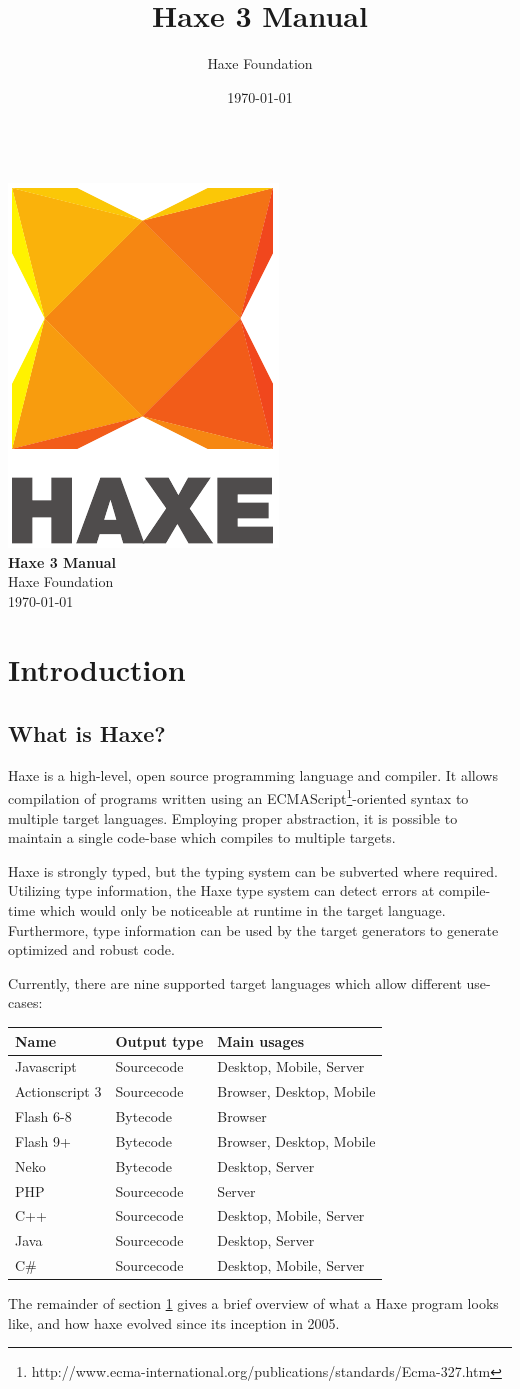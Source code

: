 \documentclass[a4paper,oneside]{book}
\renewcommand{\maketitle}{
   \begin{titlepage}
     \setcounter{page}{-1}
			\begin{center}
				~\\[3cm]
				\includegraphics[scale=1.25]{assets/logo.pdf}~\\[1cm]
				{\huge \bfseries Haxe 3 Manual}\\[7cm]
				Haxe Foundation\\
				\today
			\end{center}
   \end{titlepage}
}
\begin{document}
\title{Haxe 3 Manual}
\author{Haxe Foundation}
\date{\today}
\maketitle


\clearpage
\todototoc
\listoftodos
\clearpage

\clearpage
\tableofcontents
\clearpage

\chapter{Introduction}
\label{introduction}

\section{What is Haxe?}
\label{introduction-what-is-haxe}

Haxe is a high-level, open source programming language and compiler. It allows compilation of programs written using an ECMAScript\footnote{http://www.ecma-international.org/publications/standards/Ecma-327.htm}-oriented syntax to multiple target languages. Employing proper abstraction, it is possible to maintain a single code-base which compiles to multiple targets.

Haxe is strongly typed, but the typing system can be subverted where required. Utilizing type information, the Haxe type system can detect errors at compile-time which would only be noticeable at runtime in the target language. Furthermore, type information can be used by the target generators to generate optimized and robust code.

Currently, there are nine supported target languages which allow different use-cases:

\begin{center}
\begin{tabular}{| l | l | l |}
	\hline
	Name & Output type & Main usages \\ \hline
	Javascript & Sourcecode & Desktop, Mobile, Server \\
	Actionscript 3 & Sourcecode & Browser, Desktop, Mobile \\
	Flash 6-8 & Bytecode & Browser \\
	Flash 9+ & Bytecode & Browser, Desktop, Mobile \\ 
	Neko & Bytecode & Desktop, Server \\
	PHP & Sourcecode & Server \\
	C++ & Sourcecode & Desktop, Mobile, Server \\
	Java & Sourcecode & Desktop, Server \\
	C\# & Sourcecode & Desktop, Mobile, Server \\ \hline
\end{tabular}
\end{center}
The remainder of section \ref{introduction} gives a brief overview of what a Haxe program looks like, and how haxe evolved since its inception in 2005.
\end{document}
